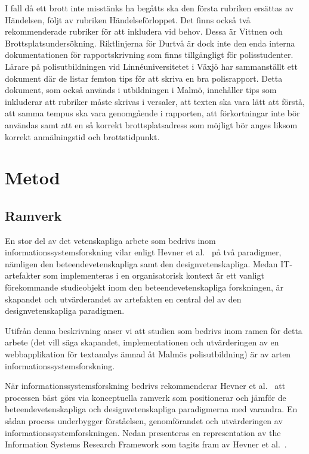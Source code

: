 \documentclass[swedish]{maucsthesis}
\begin{document}
I fall då ett brott inte misstänks ha begåtts ska den första rubriken ersättas
av Händelsen, följt av rubriken Händelseförloppet. Det finns också två
rekommenderade rubriker för att inkludera vid behov. Dessa är Vittnen och
Brottsplatsundersökning. Riktlinjerna för Durtvå är dock inte den enda interna
dokumentationen för rapportskrivning som finns tillgängligt för polisstudenter.
Lärare på polisutbildningen vid Linnéuniversitetet i Växjö har sammanställt ett
dokument \cite{per:2018} där de listar femton tips för att skriva en bra polisrapport. Detta
dokument, som också används i utbildningen i Malmö, innehåller tips som
inkluderar att rubriker måste skrivas i versaler, att texten ska vara lätt att
förstå, att samma tempus ska vara genomgående i rapporten, att förkortningar
inte bör användas samt att en så korrekt brottsplatsadress som möjligt bör
anges liksom korrekt anmälningstid och brottstidpunkt.

\section{Metod}

\subsection{Ramverk}

En stor del av det vetenskapliga arbete som bedrivs inom informationssystemsforskning vilar enligt Hevner et al.~\cite{hevner:2004} på två paradigmer, nämligen den beteendevetenskapliga samt den designvetenskapliga. Medan IT-artefakter som implementeras i en organisatorisk kontext är ett vanligt förekommande studieobjekt inom den beteendevetenskapliga forskningen, är skapandet och utvärderandet av artefakten en central del av den designvetenskapliga paradigmen.

Utifrån denna beskrivning anser vi att studien som bedrivs inom ramen för detta arbete (det vill säga skapandet, implementationen och utvärderingen av en webbapplikation för textanalys ämnad åt Malmös polisutbildning) är av arten informationssystemsforskning.

När informationssystemsforskning bedrivs rekommenderar Hevner et al.~\cite{hevner:2004} att processen bäst görs via konceptuella ramverk som positionerar och jämför de beteendevetenskapliga och designvetenskapliga paradigmerna med varandra. En sådan process underbygger förståelsen, genomförandet och utvärderingen av informationssystemforskningen.  Nedan presenteras en representation av the Information Systems Research Framework som tagits fram av Hevner et al.~\cite{hevner:2004}.
\end{document}
